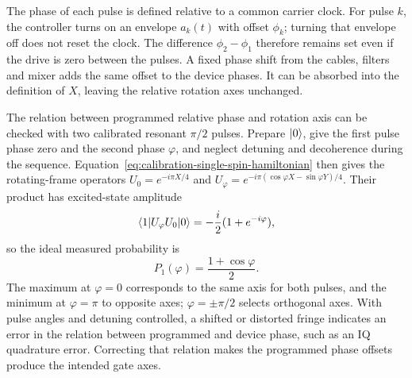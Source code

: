 The phase of each pulse is defined relative to a common carrier
clock. For pulse $k$, the controller turns on an envelope $a_k(t)$
with offset $\phi_k$; turning that envelope off does not reset
the clock. The difference $\phi_2-\phi_1$ therefore remains set
even if the drive is zero between the pulses. A fixed phase shift
from the cables, filters and mixer adds the same offset to the
device phases. It can be absorbed into the definition of $X$,
leaving the relative rotation axes unchanged.

The relation between programmed relative phase and rotation axis can be
checked with two calibrated resonant $\pi/2$ pulses. Prepare
$\lvert 0\rangle$, give the first pulse phase zero and the second phase
$\varphi$, and neglect detuning and decoherence during the
sequence. Equation~\eqref{eq:calibration-single-spin-hamiltonian}
then gives the rotating-frame operators
$U_0=e^{-i\pi X/4}$ and
$U_\varphi=e^{-i\pi(\cos\varphi X-\sin\varphi Y)/4}$.
Their product has excited-state amplitude
\[
 \langle 1\rvert U_\varphi U_0\lvert 0\rangle
 =-\frac{i}{2}(1+e^{-i\varphi}),
\]
so the ideal measured probability is
\begin{equation}
 P_1(\varphi)=\frac{1+\cos\varphi}{2}.
 \label{eq:calibration-phase-offset-scan}
\end{equation}
The maximum at $\varphi=0$ corresponds to the same axis for both
pulses, and the minimum at $\varphi=\pi$ to opposite axes;
$\varphi=\pm\pi/2$ selects orthogonal axes. With pulse angles and
detuning controlled, a shifted or distorted fringe indicates an
error in the relation between programmed and device phase, such
as an IQ quadrature error. Correcting that relation makes the
programmed phase offsets produce the intended gate axes.

